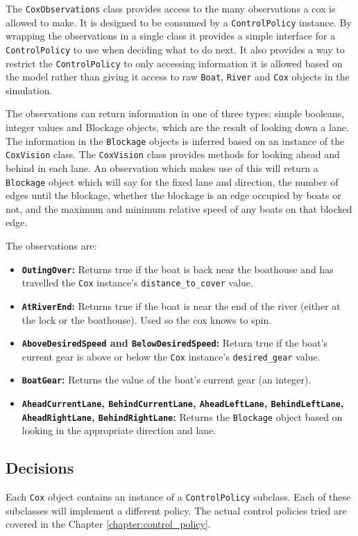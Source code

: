 The \texttt{CoxObservations} class provides access to the many observations a cox is allowed to make. It is designed to be consumed by a \texttt{ControlPolicy} instance. By wrapping the observations in a single class it provides a simple interface for a \texttt{ControlPolicy} to use when deciding what to do next. It also provides a way to restrict the \texttt{ControlPolicy} to only accessing information it is allowed based on the model rather than giving it access to raw \texttt{Boat}, \texttt{River} and \texttt{Cox} objects in the simulation.

The observations can return information in one of three types: simple booleans, integer values and Blockage objects, which are the result of looking down a lane. The information in the \texttt{Blockage} objects is inferred based on an instance of the \texttt{CoxVision} class. The \texttt{CoxVision} class provides methods for looking ahead and behind in each lane. An observation which makes use of this will return a \texttt{Blockage} object which will say for the fixed lane and direction, the number of edges until the blockage, whether the blockage is an edge occupied by boats or not, and the maximum and minimum relative speed of any boats on that blocked edge.

The observations are:
  \begin{itemize}
    \item{\textbf{\texttt{OutingOver}:}} Returns true if the boat is back near the boathouse and has travelled the \texttt{Cox} instance's \texttt{distance\_to\_cover} value.
    \item{\textbf{\texttt{AtRiverEnd}:}} Returns true if the boat is near the end of the river (either at the lock or the boathouse). Used so the cox knows to spin.
    \item{\textbf{\texttt{AboveDesiredSpeed} and \texttt{BelowDesiredSpeed}:}} Return true if the boat's current gear is above or below the \texttt{Cox} instance's \texttt{desired\_gear} value. 
    \item{\textbf{\texttt{BoatGear}:}} Returns the value of the boat's current gear (an integer).
    \item{\textbf{\texttt{AheadCurrentLane}, \texttt{BehindCurrentLane}, \texttt{AheadLeftLane}, \texttt{BehindLeftLane}, \texttt{AheadRightLane}, \texttt{BehindRightLane}:}} Returns the \texttt{Blockage} object based on looking in the appropriate direction and lane.
  \end{itemize}
  
\subsection{Decisions}
  Each \texttt{Cox} object contains an instance of a \texttt{ControlPolicy} subclass. Each of these subclasses will implement a different policy. The actual control policies tried are covered in the Chapter \ref{chapter:control_policy}. 
  
